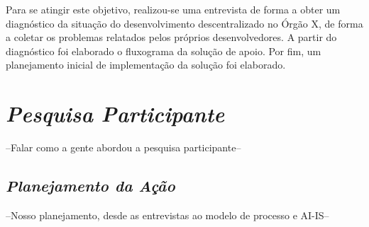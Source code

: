 Para se atingir este objetivo, realizou-se uma entrevista de forma a obter um diagnóstico da situação do desenvolvimento descentralizado no Órgão X, de forma a coletar os problemas relatados pelos próprios desenvolvedores. A partir do diagnóstico foi elaborado o fluxograma da solução de apoio. Por fim, um planejamento inicial de implementação da solução foi elaborado.

\section{\textit{Pesquisa Participante}}

--Falar como a gente abordou a pesquisa participante--

\subsection{\textit{Planejamento da Ação}}

--Nosso planejamento, desde as entrevistas ao modelo de processo e AI-IS--

